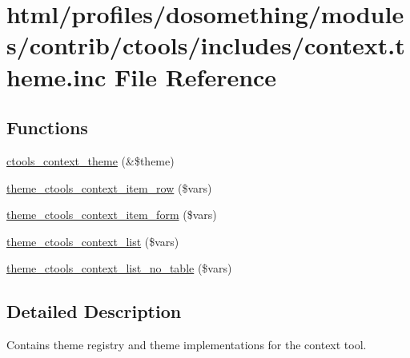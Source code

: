 \hypertarget{context_8theme_8inc}{
\section{html/profiles/dosomething/modules/contrib/ctools/includes/context.theme.inc File Reference}
\label{context_8theme_8inc}
}
\subsection*{Functions}
\begin{DoxyCompactItemize}
\item 
\hyperlink{context_8theme_8inc_aee55c917e7b5c7aa1b692648e3e3afeb}{ctools\_\-context\_\-theme} (\&\$theme)
\item 
\hyperlink{context_8theme_8inc_a235f6b6bdf1635a0e13580793e5aedf4}{theme\_\-ctools\_\-context\_\-item\_\-row} (\$vars)
\item 
\hyperlink{context_8theme_8inc_a398190b6916d7cd66e63a9f5e8ce1692}{theme\_\-ctools\_\-context\_\-item\_\-form} (\$vars)
\item 
\hyperlink{context_8theme_8inc_ac1c4694176a4b8f87275932cfd677cb1}{theme\_\-ctools\_\-context\_\-list} (\$vars)
\item 
\hyperlink{context_8theme_8inc_a3898a3531ef6e3b88e375f5ea59dca5c}{theme\_\-ctools\_\-context\_\-list\_\-no\_\-table} (\$vars)
\end{DoxyCompactItemize}


\subsection{Detailed Description}
Contains theme registry and theme implementations for the context tool. 

